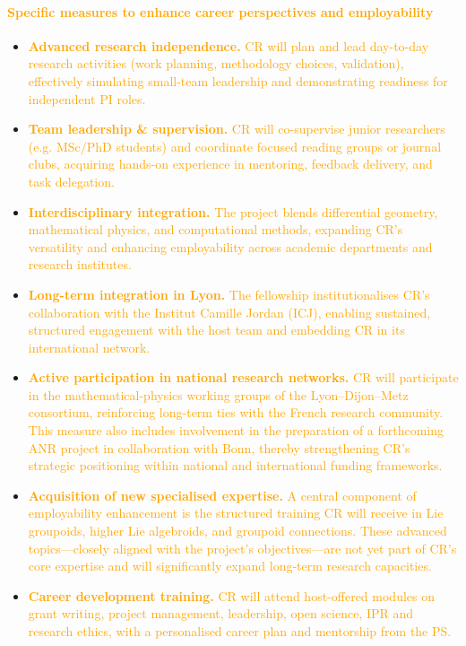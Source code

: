 \documentclass[11pt,draftproposal]{msca-pf}
\begin{document}
\paragraph*{\textcolor{orange}{Specific measures to enhance career perspectives and employability}}
\begin{itemize}[noitemsep,topsep=2pt]
  \item \textcolor{orange}{\textbf{Advanced research independence.} CR will plan and lead day-to-day research activities (work planning, methodology choices, validation), effectively simulating small-team leadership and demonstrating readiness for independent PI roles.}
  \item \textcolor{orange}{\textbf{Team leadership \& supervision.} CR will co-supervise junior researchers (e.g. MSc/PhD students) and coordinate focused reading groups or journal clubs, acquiring hands-on experience in mentoring, feedback delivery, and task delegation.}
  \item \textcolor{orange}{\textbf{Interdisciplinary integration.} The project blends differential geometry, mathematical physics, and computational methods, expanding CR’s versatility and enhancing employability across academic departments and research institutes.}
  \item \textcolor{orange}{\textbf{Long-term integration in Lyon.} The fellowship institutionalises CR’s collaboration with the Institut Camille Jordan (ICJ), enabling sustained, structured engagement with the host team and embedding CR in its international network.}
  \item \textcolor{orange}{\textbf{Active participation in national research networks.} CR will participate in the mathematical-physics working groups of the Lyon–Dijon–Metz consortium, reinforcing long-term ties with the French research community. This measure also includes involvement in the preparation of a forthcoming ANR project in collaboration with Bonn, thereby strengthening CR’s strategic positioning within national and international funding frameworks.}
  \item \textcolor{orange}{\textbf{Acquisition of new specialised expertise.} A central component of employability enhancement is the structured training CR will receive in Lie groupoids, higher Lie algebroids, and groupoid connections. These advanced topics—closely aligned with the project’s objectives—are not yet part of CR’s core expertise and will significantly expand long-term research capacities.}
  \item \textcolor{orange}{\textbf{Career development training.} CR will attend host-offered modules on grant writing, project management, leadership, open science, IPR and research ethics, with a personalised career plan and mentorship from the PS.}

\end{itemize}
\end{document}
